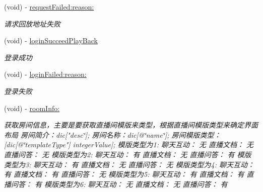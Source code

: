 \begin{DoxyCompactItemize}
\mbox{\label{protocol_request_data_play_back_delegate_01-p_a4e89ce484e3ccbaf3c6ba75216101680}} 
(void) -\/ \hyperlink{protocol_request_data_play_back_delegate_01-p_a4e89ce484e3ccbaf3c6ba75216101680}{request\+Failed\+:reason\+:}
\begin{DoxyCompactList}\small\item\em 请求回放地址失败 \end{DoxyCompactList}\item 
\mbox{\label{protocol_request_data_play_back_delegate_01-p_a77d27553a05331fdb9ac9228caffa8cf}} 
(void) -\/ \hyperlink{protocol_request_data_play_back_delegate_01-p_a77d27553a05331fdb9ac9228caffa8cf}{login\+Succeed\+Play\+Back}
\begin{DoxyCompactList}\small\item\em 登录成功 \end{DoxyCompactList}\item 
\mbox{\label{protocol_request_data_play_back_delegate_01-p_a212a1d84b3c6c7c6912862685bc6c3d2}} 
(void) -\/ \hyperlink{protocol_request_data_play_back_delegate_01-p_a212a1d84b3c6c7c6912862685bc6c3d2}{login\+Failed\+:reason\+:}
\begin{DoxyCompactList}\small\item\em 登录失败 \end{DoxyCompactList}\item 
\mbox{\label{protocol_request_data_play_back_delegate_01-p_a5d95b3b010add854c2467f365612d9a3}} 
(void) -\/ \hyperlink{protocol_request_data_play_back_delegate_01-p_a5d95b3b010add854c2467f365612d9a3}{room\+Info\+:}
\begin{DoxyCompactList}\small\item\em 获取房间信息，主要是要获取直播间模版来类型，根据直播间模版类型来确定界面布局 房间简介：dic\mbox{[}"desc\char`\"{}\mbox{]};
房间名称：dic\mbox{[}@\char`\"{}name\char`\"{}\mbox{]};
房间模版类型：\mbox{[}dic\mbox{[}@\char`\"{}template\+Type"\mbox{]} integer\+Value\mbox{]}; 模版类型为1\+: 聊天互动： 无 直播文档： 无 直播问答： 无 模版类型为2\+: 聊天互动： 有 直播文档： 无 直播问答： 有 模版类型为3\+: 聊天互动： 有 直播文档： 无 直播问答： 无 模版类型为4\+: 聊天互动： 有 直播文档： 有 直播问答： 无 模版类型为5\+: 聊天互动： 有 直播文档： 有 直播问答： 有 模版类型为6\+: 聊天互动： 无 直播文档： 无 直播问答： 有 \end{DoxyCompactList}\item 

\end{DoxyCompactItemize}
